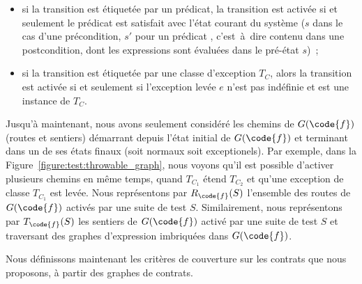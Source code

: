 \begin{itemize}
\item si la transition est étiquetée par un prédicat, la transition est activée
si et seulement le prédicat est satisfait avec l'état courant du système ($s$
dans le cas d'une précondition, $s'$ pour un prédicat ,
c'est~à~dire contenu dans une postcondition, dont les expressions \aold{\empty}
sont évaluées dans le pré-état $s$)~;

\item si la transition est étiquetée par une classe d'exception $T_C$, alors la
transition est activée si et seulement si l'exception levée $e$ n'est pas
indéfinie et est une instance de $T_C$.

\end{itemize}

Jusqu'à maintenant, nous avons seulement considéré les chemins de $G(\code{f})$
(routes et sentiers) démarrant depuis l'état initial de $G(\code{f})$ et
terminant dans un de ses états finaux (soit normaux soit exceptionels). Par
exemple, dans la Figure~\ref{figure:test:throwable_graph}, nous voyons qu'il est
possible d'activer plusieurs chemins en même temps, quand $T_{C_1}$ étend
$T_{C_2}$ et qu'une exception de classe $T_{C_1}$ est levée. Nous représentons
par $R_\code{f}(S)$ l'ensemble des routes de $G(\code{f})$ activés par une suite
de test $S$. Similairement, nous représentons par $T_\code{f}(S)$ les sentiers
de $G(\code{f})$ activé par une suite de test $S$ et traversant des graphes
d'expression imbriquées dans $G(\code{f})$.

Nous définissons maintenant les critères de couverture sur les contrats que nous
proposons, à partir des graphes de contrats.


